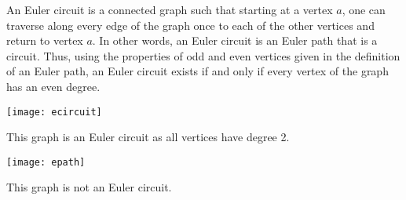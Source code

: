 \documentclass[12pt]{article}
\begin{document}
An Euler circuit is a connected graph such that starting at a vertex $a$, one can traverse along every edge of the graph once to each of the other vertices and return to vertex $a$. In other words, an Euler circuit is an Euler path that is a circuit. Thus, using the properties of odd and even  vertices given in the definition of an Euler path, an Euler circuit exists if and only if every vertex of the graph has an even degree.

\begin{center}
  \texttt{[image: ecircuit]}
\end{center}

This graph is an Euler circuit as all vertices have degree 2.

\begin{center}
\texttt{[image: epath]}
\end{center}

This graph is not an Euler circuit.
\end{document}
